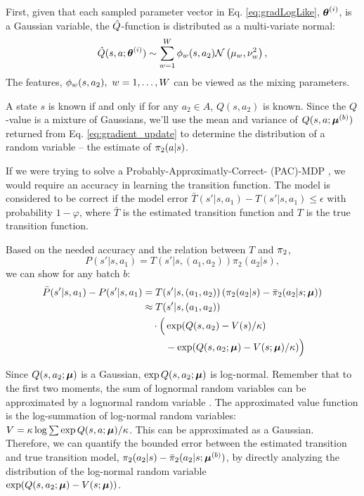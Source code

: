 First, given that each sampled parameter vector in Eq. \ref{eq:gradLogLike}, $\boldsymbol{\mathbb{\theta}}^{(i)}$, is a Gaussian
variable, the $\hat{Q}$-function is distributed as a multi-variate normal:
\[
\hat{Q}(s,a ;\boldsymbol{\mathbb{\theta}}^{(i)}) \sim \sum_{w=1}^W \phi_{w}(s,a_2) \mathcal{N}\left(\mu_w, \nu_w^2\right),
\]
The features, $\phi_{w}(s,a_2),\ w=1,\ldots, W$ can be viewed as the mixing parameters.

A state $s$ is known if and only if for any $a_2 \in A$, $Q(s,a_2)$ is known. Since the $Q$-value is a mixture of
Gaussians, we'll use the mean and variance of $Q(s,a;\boldsymbol{\mathbb{\mu}}^{(b)})$ returned from Eq.
\ref{eq:gradient_update} to determine the distribution of a random variable -- the estimate of $\pi_{2}(a|s)$.

If we were trying to solve a Probably-Approximatly-Correct- (PAC)-MDP \cite{Fu-RSS-14}, we would require an accuracy in
learning the transition function. The model is considered to be correct if the model error $\bar T(s'|s,a_1) -
T(s'|s,a_1) \le \epsilon$ with probability $1-\varphi$, where $\bar T$ is the estimated transition function and $T$ is
the true transition function.

Based on the needed accuracy and the relation between $T$ and $\pi_{2}$,
\[
P(s'|s,a_1) = T(s'|s,(a_1,a_2))\pi_2(a_2|s),
\]
we can show for any batch $b$:
\begin{align*}
\bar P(s'|s,a_1)  -P(s'|s,a_1)
& = T(s'|s,(a_1,a_2))\left( \pi_2(a_2|s) - \bar \pi_2(a_2|s;\boldsymbol{\mathbb{\mu}})
\right)\\
& \approx T(s'|s,(a_1,a_2)) \\
& \quad \cdot \Big(\exp(Q(s,a_2)-V(s)/\kappa) \\
& \qquad\ - \exp(Q(s,a_2;\boldsymbol{\mathbb{\mu}})-V(s;\boldsymbol{\mathbb{\mu}})/\kappa) \Big)
\end{align*}

Since $Q(s,a_2;\boldsymbol{\mathbb{\mu}})$ is a Gaussian, $\exp Q(s,a_2;\boldsymbol{\mathbb{\mu}})$ is log-normal. Remember that to the first two
moments, the sum of lognormal random variables can be approximated by a lognormal random variable \cite{fenton1960sum}.
The approximated value function is the log-summation of log-normal random variables: ${V =\kappa \log \sum \exp
Q(s,a;\boldsymbol{\mathbb{\mu}})/\kappa}$. This can be approximated as a Gaussian. Therefore, we can quantify the bounded error between
the estimated transition and true transition model, $\pi_2(a_2|s) - \bar \pi_2(a_2|s;\boldsymbol{\mathbb{\mu}}^{(b)})$,  by directly
analyzing the distribution of the log-normal random variable\\
{\(\exp(Q(s,a_2;\boldsymbol{\mathbb{\mu}})-V(s;\boldsymbol{\mathbb{\mu}}))\)}.

